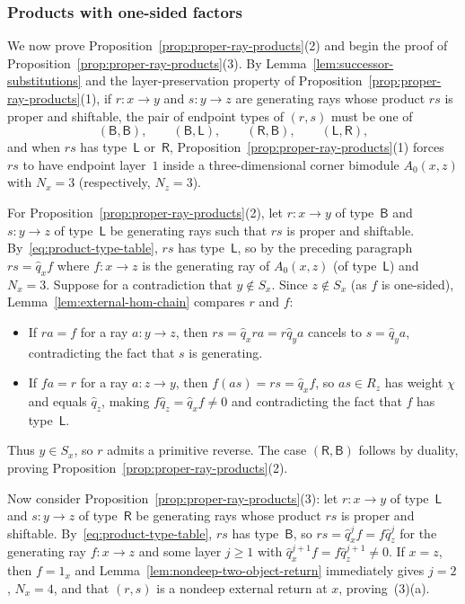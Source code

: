 \subsubsection{Products with one-sided factors}

We now prove Proposition~\ref{prop:proper-ray-products}(2) and begin the proof of Proposition~\ref{prop:proper-ray-products}(3). By Lemma~\ref{lem:successor-substitutions} and the layer-preservation property of Proposition~\ref{prop:proper-ray-products}(1), if $r\colon x\to y$ and $s\colon y\to z$ are generating rays whose product $rs$ is proper and shiftable, the pair of endpoint types of $(r,s)$ must be one of
\[
  (\mathsf B,\mathsf B),\qquad (\mathsf B,\mathsf L),\qquad (\mathsf R,\mathsf B),\qquad (\mathsf L,\mathsf R),
\]
and when $rs$ has type~$\mathsf L$ or~$\mathsf R$, Proposition~\ref{prop:proper-ray-products}(1) forces $rs$ to have endpoint layer~$1$ inside a three-dimensional corner bimodule $A_0(x,z)$ with $N_x=3$ (respectively, $N_z=3$).

For Proposition~\ref{prop:proper-ray-products}(2), let $r\colon x\to y$ of type~$\mathsf B$ and $s\colon y\to z$ of type~$\mathsf L$ be generating rays such that $rs$ is proper and shiftable. By~\eqref{eq:product-type-table}, $rs$ has type~$\mathsf L$, so by the preceding paragraph $rs=\widehat q_xf$ where $f\colon x\to z$ is the generating ray of $A_0(x,z)$ (of type~$\mathsf L$) and $N_x=3$. Suppose for a contradiction that $y\notin S_x$. Since $z\notin S_x$ (as $f$ is one-sided), Lemma~\ref{lem:external-hom-chain} compares $r$ and $f$:
\begin{itemize}
\item If $ra=f$ for a ray $a\colon y\to z$, then $rs=\widehat q_xra=r\widehat q_ya$ cancels to $s=\widehat q_ya$, contradicting the fact that $s$ is generating.
\item If $fa=r$ for a ray $a\colon z\to y$, then $f(as)=rs=\widehat q_xf$, so $as\in R_z$ has weight $\chi$ and equals $\widehat q_z$, making $f\widehat q_z=\widehat q_xf\ne0$ and contradicting the fact that $f$ has type~$\mathsf L$.
\end{itemize}
Thus $y\in S_x$, so $r$ admits a primitive reverse. The case $(\mathsf R,\mathsf B)$ follows by duality, proving Proposition~\ref{prop:proper-ray-products}(2).

Now consider Proposition~\ref{prop:proper-ray-products}(3): let $r\colon x\to y$ of type~$\mathsf L$ and $s\colon y\to z$ of type~$\mathsf R$ be generating rays whose product $rs$ is proper and shiftable. By~\eqref{eq:product-type-table}, $rs$ has type~$\mathsf B$, so $rs=\widehat q_x^jf=f\widehat q_z^j$ for the generating ray $f\colon x\to z$ and some layer $j\geq1$ with $\widehat q_x^{j+1}f=f\widehat q_z^{j+1}\ne0$. If $x=z$, then $f=1_x$ and Lemma~\ref{lem:nondeep-two-object-return} immediately gives $j=2$, $N_x=4$, and that $(r,s)$ is a nondeep external return at $x$, proving~(3)(a).

